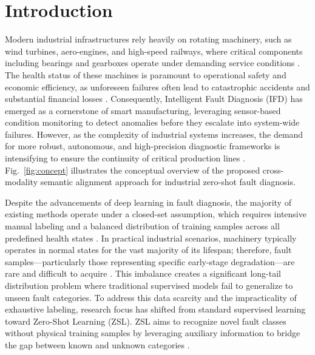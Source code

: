 \section{Introduction}
Modern industrial infrastructures rely heavily on rotating machinery, such as wind turbines, aero-engines, and high-speed railways, where critical components including bearings and gearboxes operate under demanding service conditions \cite{zhai2021multi}. The health status of these machines is paramount to operational safety and economic efficiency, as unforeseen failures often lead to catastrophic accidents and substantial financial losses \cite{lei2020applications}. Consequently, Intelligent Fault Diagnosis (IFD) has emerged as a cornerstone of smart manufacturing, leveraging sensor-based condition monitoring to detect anomalies before they escalate into system-wide failures. However, as the complexity of industrial systems increases, the demand for more robust, autonomous, and high-precision diagnostic frameworks is intensifying to ensure the continuity of critical production lines \cite{li2020deep}. Fig.~\ref{fig:concept} illustrates the conceptual overview of the proposed cross-modality semantic alignment approach for industrial zero-shot fault diagnosis.

Despite the advancements of deep learning in fault diagnosis, the majority of existing methods operate under a closed-set assumption, which requires intensive manual labeling and a balanced distribution of training samples across all predefined health states \cite{zhang2022digital}. In practical industrial scenarios, machinery typically operates in normal states for the vast majority of its lifespan; therefore, fault samples---particularly those representing specific early-stage degradation---are rare and difficult to acquire \cite{liu2018zero}. This imbalance creates a significant long-tail distribution problem where traditional supervised models fail to generalize to unseen fault categories. To address this data scarcity and the impracticality of exhaustive labeling, research focus has shifted from standard supervised learning toward Zero-Shot Learning (ZSL). ZSL aims to recognize novel fault classes without physical training samples by leveraging auxiliary information to bridge the gap between known and unknown categories \cite{wang2019zero, socher2013zero}.

